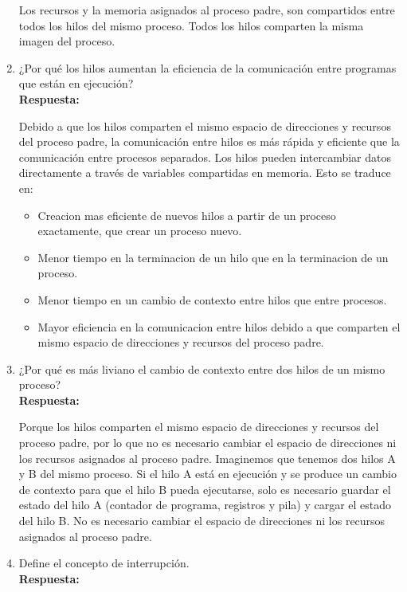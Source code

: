 \documentclass[a4paper,12pt]{article}
\begin{document}
\begin{enumerate}[label=\textbf{Pregunta \arabic*.}]
    Los recursos y la memoria asignados al proceso padre, son compartidos entre todos los hilos del mismo proceso. Todos los hilos comparten la misma imagen del proceso.
    \newpage

    \item ¿Por qué los hilos aumentan la eficiencia de la comunicación entre programas que están en ejecución? \\ %
    \textbf{Respuesta:} 
    
    Debido a que los hilos comparten el mismo espacio de direcciones y recursos del proceso padre, la comunicación entre hilos es más rápida y eficiente que la comunicación entre procesos separados. Los hilos pueden intercambiar datos directamente a través de variables compartidas en memoria. Esto se traduce en:
    
    \begin{itemize}
        \item Creacion mas eficiente de nuevos hilos a partir de un proceso exactamente, que crear un proceso nuevo.
        \item Menor tiempo en la terminacion de un hilo que en la terminacion de un proceso.
        \item Menor tiempo en un cambio de contexto entre hilos que entre procesos.
        \item Mayor eficiencia en la comunicacion entre hilos debido a que comparten el mismo espacio de direcciones y recursos del proceso padre.
    \end{itemize}

    \item ¿Por qué es más liviano el cambio de contexto entre dos hilos de un mismo proceso? \\
    \textbf{Respuesta:} 
    
    Porque los hilos comparten el mismo espacio de direcciones y recursos del proceso padre, por lo que no es necesario cambiar el espacio de direcciones ni los recursos asignados al proceso padre. Imaginemos que tenemos dos hilos A y B del mismo proceso. Si el hilo A está en ejecución y se produce un cambio de contexto para que el hilo B pueda ejecutarse, solo es necesario guardar el estado del hilo A (contador de programa, registros y pila) y cargar el estado del hilo B. No es necesario cambiar el espacio de direcciones ni los recursos asignados al proceso padre.


    \item Define el concepto de interrupción. \\ %
    \textbf{Respuesta:} 
    

\end{enumerate}
\end{document}
